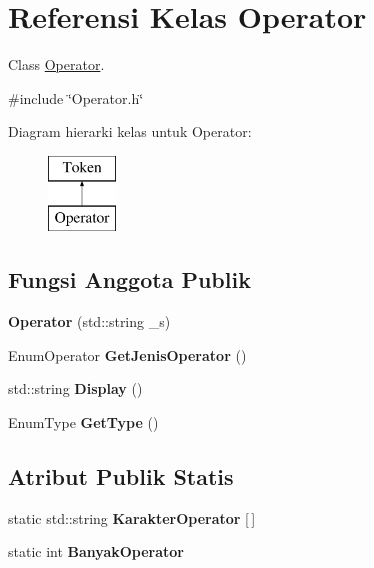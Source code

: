 \hypertarget{classOperator}{}\section{Referensi Kelas Operator}
\label{classOperator}


Class \hyperlink{classOperator}{Operator}.  




{\ttfamily \#include \char`\"{}Operator.\+h\char`\"{}}

Diagram hierarki kelas untuk Operator\+:\begin{figure}[H]
\begin{center}
\leavevmode
\includegraphics[height=2.000000cm]{d4/dad/classOperator}
\end{center}
\end{figure}
\subsection*{Fungsi Anggota Publik}
\begin{DoxyCompactItemize}
\item 
\hypertarget{classOperator_a2199e61dda5314db8401081f2178d9a9}{}{\bfseries Operator} (std\+::string \+\_\+s)\label{classOperator_a2199e61dda5314db8401081f2178d9a9}

\item 
\hypertarget{classOperator_af0113b1134d9e54abd2a05ea69c63238}{}Enum\+Operator {\bfseries Get\+Jenis\+Operator} ()\label{classOperator_af0113b1134d9e54abd2a05ea69c63238}

\item 
\hypertarget{classOperator_a97faadd3b0c23c108eba25c409b0003d}{}std\+::string {\bfseries Display} ()\label{classOperator_a97faadd3b0c23c108eba25c409b0003d}

\item 
\hypertarget{classOperator_a52745643d188234ebac14062af0fb69c}{}Enum\+Type {\bfseries Get\+Type} ()\label{classOperator_a52745643d188234ebac14062af0fb69c}

\end{DoxyCompactItemize}
\subsection*{Atribut Publik Statis}
\begin{DoxyCompactItemize}
\item 
\hypertarget{classOperator_a932146b92cb0b726be4ec8674af116f4}{}static std\+::string {\bfseries Karakter\+Operator} \mbox{[}$\,$\mbox{]}\label{classOperator_a932146b92cb0b726be4ec8674af116f4}

\item 
\hypertarget{classOperator_a8064c68677326d96415034012d90ba7d}{}static int {\bfseries Banyak\+Operator}\label{classOperator_a8064c68677326d96415034012d90ba7d}

\end{DoxyCompactItemize}
